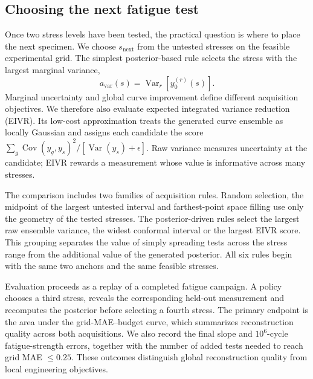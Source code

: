 \documentclass[a4paper,fleqn]{cas-dc}
\begin{document}
\subsection{Choosing the next fatigue test}

Once two stress levels have been tested, the practical question is where to place the next specimen. We choose $s_{\mathrm{next}}$ from the untested stresses on the feasible experimental grid. The simplest posterior-based rule selects the stress with the largest marginal variance,
\begin{equation}
 a_{\mathrm{var}}(s)=\operatorname{Var}_{r}
 [y^{(r)}_0(s)].
 \label{eq:variance_acq}
\end{equation}
Marginal uncertainty and global curve improvement define different acquisition objectives. We therefore also evaluate expected integrated variance reduction (EIVR). Its low-cost approximation treats the generated curve ensemble as locally Gaussian and assigns each candidate the score $\sum_g\operatorname{Cov}(y_g,y_s)^2/[\operatorname{Var}(y_s)+\epsilon]$. Raw variance measures uncertainty at the candidate; EIVR rewards a measurement whose value is informative across many stresses.

The comparison includes two families of acquisition rules. Random selection, the midpoint of the largest untested interval and farthest-point space filling use only the geometry of the tested stresses. The posterior-driven rules select the largest raw ensemble variance, the widest conformal interval or the largest EIVR score. This grouping separates the value of simply spreading tests across the stress range from the additional value of the generated posterior. All six rules begin with the same two anchors and the same feasible stresses.

Evaluation proceeds as a replay of a completed fatigue campaign. A policy chooses a third stress, reveals the corresponding held-out measurement and recomputes the posterior before selecting a fourth stress. The primary endpoint is the area under the grid-MAE--budget curve, which summarizes reconstruction quality across both acquisitions. We also record the final slope and $10^6$-cycle fatigue-strength errors, together with the number of added tests needed to reach grid MAE $\leq0.25$. These outcomes distinguish global reconstruction quality from local engineering objectives.
\end{document}
